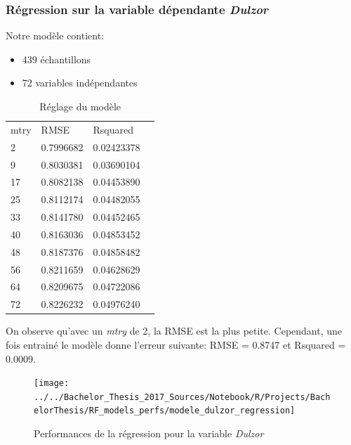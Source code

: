 



\newpage
\subsubsection{Régression sur la variable dépendante \textit{Dulzor}}
\noindent Notre modèle contient: 
\begin{itemize}
	\item 439 échantillons
	\item 72 variables indépendantes
\end{itemize}


\begin{table}[H]
	\centering
	\caption{Réglage du modèle}
	\label{RF_Dulzor_Resampling}
	\begin{tabular}{llll}
	mtry & RMSE      & Rsquared   \\
	2    & 0.7996682 & 0.02423378 \\
	9    & 0.8030381 & 0.03690104 \\
	17   & 0.8082138 & 0.04453890 \\
	25   & 0.8112174 & 0.04482055 \\
	33   & 0.8141780 & 0.04452465 \\
	40   & 0.8163036 & 0.04853452 \\
	48   & 0.8187376 & 0.04858482 \\
	56   & 0.8211659 & 0.04628629 \\
	64   & 0.8209675 & 0.04722086 \\
	72   & 0.8226232 & 0.04976240
	\end{tabular}
\end{table}

\noindent On observe qu'avec un \textit{mtry} de 2, la RMSE est la plus petite. Cependant, une fois entrainé le modèle donne l'erreur suivante: RMSE = 0.8747  et Rsquared = 0.0009. 

\begin{figure}[H]
	\centering
	\texttt{[image: ../../Bachelor\_Thesis\_2017\_Sources/Notebook/R/Projects/BachelorThesis/RF\_models\_perfs/modele\_dulzor\_regression]}
	\caption{Performances de la régression pour la variable \textit{Dulzor}}
	\label{fig:modeledulzorregression}
\end{figure}



